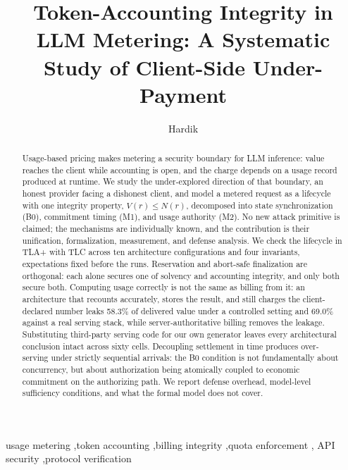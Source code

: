 \documentclass[preprint,3p,authoryear,12pt]{elsarticle}
\begin{document}
\begin{frontmatter}

\title{Token-Accounting Integrity in LLM Metering: A Systematic Study of Client-Side
Under-Payment}

\author[iitp,vips]{Hardik}
\address[iitp]{Department of Computer Science and Data Analytics, Indian Institute of
Technology Patna, India}
\address[vips]{Vivekananda School of Engineering and Technology, Vivekananda Institute
of Professional Studies - Technical Campus, New Delhi, India}

\begin{abstract}
Usage-based pricing makes metering a security boundary for LLM inference: value reaches
the client while accounting is open, and the charge depends on a usage record produced
at runtime. We study the under-explored direction of that boundary, an honest
provider facing a dishonest client, and model a metered request as a lifecycle with
one integrity property, $V(r) \le N(r)$, decomposed into state synchronization (B0),
commitment timing (M1), and usage authority (M2). No new attack primitive is claimed; the
mechanisms are individually known, and the contribution is their unification,
formalization, measurement, and defense analysis. We check the lifecycle in TLA+ with TLC
across ten architecture configurations and four invariants, expectations fixed before the
runs. Reservation and abort-safe finalization are orthogonal: each alone secures one of
solvency and accounting integrity, and only both secure both. Computing usage correctly
is not the same as billing from it: an architecture that recounts accurately, stores the
result, and still charges the client-declared number leaks 58.3\% of delivered value
under a controlled setting and 69.0\% against a real serving stack, while
server-authoritative billing removes the leakage. Substituting third-party serving code
for our own generator leaves every architectural conclusion intact across sixty cells.
Decoupling settlement in time produces over-serving under strictly sequential arrivals:
the B0 condition is not fundamentally about concurrency, but about authorization being
atomically coupled to economic commitment on the authorizing path. We report defense
overhead, model-level sufficiency conditions, and what the formal model does not cover.
\end{abstract}

\begin{keyword}
usage metering \sep token accounting \sep billing integrity \sep quota enforcement \sep
API security \sep protocol verification
\end{keyword}

\end{frontmatter}
\end{document}

